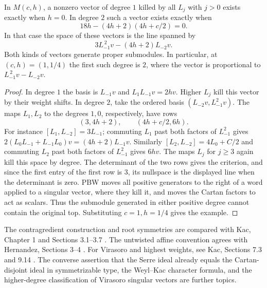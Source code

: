 \begin{example}
\label{res:KM14}
In \(M(c,h)\), a nonzero vector of degree \(1\) killed by all
\(L_j\) with \(j>0\) exists exactly when \(h=0\). In degree \(2\)
such a vector exists exactly when
\[
 18h-(4h+2)(4h+c/2)=0 .
\]
In that case the space of these vectors is the line spanned by
\[
 3 L_{-1}^{\,2}v-(4h+2)L_{-2}v .
\]
Both kinds of vectors generate proper submodules. In particular,
at \((c,h)=(1,1/4)\) the first such degree is \(2\), where the
vector is proportional to \(L_{-1}^{\,2}v-L_{-2}v\).
\end{example}

\begin{proof}
In degree \(1\) the basis is \(L_{-1}v\) and \(L_1L_{-1}v=2hv\).
Higher \(L_j\) kill this vector by their weight shifts.
In degree \(2\), take the ordered basis
\((L_{-2}v,L_{-1}^2v)\). The maps \(L_1,L_2\) to the
degrees \(1,0\), respectively, have rows
\[
 (3,4h+2), \qquad (4h+c/2,6h).
\]
For instance \([L_1,L_{-2}]=3L_{-1}\);
commuting \(L_1\) past both factors of \(L_{-1}^2\)
gives \(2(L_0L_{-1}+L_{-1}L_0)v=(4h+2)L_{-1}v\).
Similarly \([L_2,L_{-2}]=4L_0+C/2\) and commuting
\(L_2\) past both factors of \(L_{-1}^2\) gives \(6hv\).
The maps \(L_j\) for \(j\ge3\) again kill this space by degree.
The determinant of the two rows gives the criterion, and since
the first entry of the first row is \(3\), its nullspace is the
displayed line when the determinant is zero.
PBW moves all positive generators to the right of a word
applied to a singular vector, where they kill it, and moves
the Cartan factors to act as scalars. Thus the submodule generated
in either positive degree cannot contain the original top.
Substituting \(c=1,h=1/4\) gives the example.
\end{proof}

The contragredient construction and root symmetries are compared with
Kac, Chapter 1 and Sections 3.1--3.7 \cite{kac}.
The untwisted affine convention agrees with Hernandez,
Sections 3--4 \cite{hernandez-affine}. For Virasoro and highest
weights, see Kac, Sections 7.3 and 9.14 \cite{kac}.
The converse assertion that the Serre ideal already equals the
Cartan-disjoint ideal in symmetrizable type, the Weyl--Kac character
formula, and the higher-degree classification of Virasoro singular
vectors are further topics.
